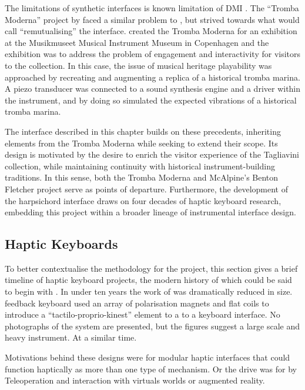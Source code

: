 The limitations of synthetic interfaces is known limitation of DMI \textcite{magnusson_survey_2007}. The ``Tromba Moderna'' project by \textcite{baldwin_tromba_2016} faced a similar problem to \textcite{mcalpine_sampling_2014}, but strived towards what \textcite{cook_remutualizing_2004} would call ``remutualising'' the interface. \textcite{baldwin_tromba_2016} created the Tromba Moderna for an exhibition at the Musikmuseet Musical Instrument Museum in Copenhagen and the exhibition was to address the problem of engagement and interactivity for visitors to the collection. In this case, the issue of musical heritage playability was approached by recreating and augmenting a replica of a historical tromba marina. A piezo transducer was connected to a sound synthesis engine and a driver within the instrument, and by doing so simulated the expected vibrations of a historical tromba marina. 

The interface described in this chapter builds on these precedents, inheriting
elements from the Tromba Moderna while seeking to extend their scope. Its
design is motivated by the desire to enrich the visitor experience of the
Tagliavini collection, while maintaining continuity with historical
instrument-building traditions. In this sense, both the Tromba Moderna
\cite{baldwin_tromba_2016} and McAlpine’s Benton Fletcher project
\cite{mcalpine_sampling_2014} serve as points of departure. Furthermore, the
development of the harpsichord interface draws on four decades of haptic
keyboard research, embedding this project within a broader lineage of
instrumental interface design.

\subsection{Haptic Keyboards}

To better contextualise the methodology for the project, this section gives a brief timeline of haptic keyboard projects, the modern history of which could be said to begin with 
\textcite{cadoz_synthese_1981}. In under ten years the work of \textcite{cadoz_synthese_1981} was dramatically reduced in size. \textcite{cadoz_modular_1990} feedback keyboard used an array of polarisation magnets and flat coils to introduce a ``tactilo-proprio-kinest'' element to a to a keyboard interface. No photographs of the system are presented, but the figures suggest a large scale and heavy instrument. At a similar time.

Motivations behind these designs were for modular haptic interfaces \cite{cadoz_modular_1990} that could function haptically as more than one type of mechanism. Or the drive was for  by Teleoperation and interaction with virtuals worlds or augmented reality.

